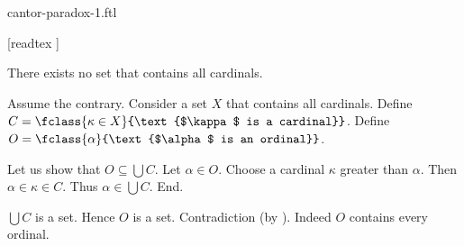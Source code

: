 \documentclass{stex}
\begin{document}
\begin{smodule}{cantor-paradox-1.ftl}

  \begin{forthel}
    [readtex ]
  \end{forthel}

  \begin{ftheorem*}[label=cantor_paradox_1,title=Cantor's First Paradox]
    There exists no set that contains all cardinals.
  \end{ftheorem*}
  \begin{fproof}
    Assume the contrary.
    Consider a set $X$ that contains all cardinals.
    Define $C = \fclass{\kappa \in X}{\text{$\kappa$ is a cardinal}}$.
    Define $O = \fclass{\alpha}{\text{$\alpha$ is an ordinal}}$.

    Let us show that $O \subseteq \bigcup C$.
      Let $\alpha \in O$.
      Choose a cardinal $\kappa$ greater than $\alpha$.
      Then $\alpha \in \kappa \in C$.
      Thus $\alpha \in \bigcup C$.
    End.

    $\bigcup C$ is a set.
    Hence $O$ is a set.
    Contradiction (by ).
    Indeed $O$ contains every ordinal.
  \end{fproof}
\end{smodule}
\end{document}
